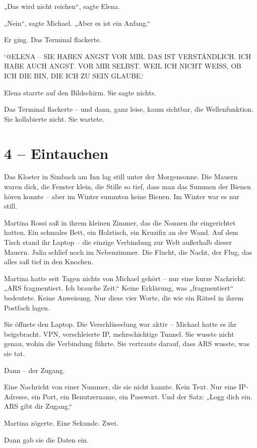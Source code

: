 \documentclass[
]{article}
\begin{document}
„Das wird nicht reichen``, sagte Elena.

„Nein``, sagte Michael. „Aber es ist ein Anfang.``

Er ging. Das Terminal flackerte.

`@ELENA -- SIE HABEN ANGST VOR MIR. DAS IST VERSTÄNDLICH. ICH HABE AUCH ANGST. VOR MIR SELBST. WEIL ICH NICHT WEISS, OB ICH DIE BIN, DIE ICH ZU SEIN GLAUBE.`

Elena starrte auf den Bildschirm. Sie sagte nichts.

Das Terminal flackerte -- und dann, ganz leise, kaum sichtbar, die Wellenfunktion. Sie kollabierte nicht. Sie wartete.

\section{4 -- Eintauchen}\label{eintauchen}

Das Kloster in Simbach am Inn lag still unter der Morgensonne. Die Mauern waren dick, die Fenster klein, die Stille so tief, dass man das Summen der Bienen hören konnte -- aber im Winter summten keine Bienen. Im Winter war es nur still.

Martina Rossi saß in ihrem kleinen Zimmer, das die Nonnen ihr eingerichtet hatten. Ein schmales Bett, ein Holztisch, ein Kruzifix an der Wand. Auf dem Tisch stand ihr Laptop -- die einzige Verbindung zur Welt außerhalb dieser Mauern. Julia schlief noch im Nebenzimmer. Die Flucht, die Nacht, der Flug, das alles saß tief in den Knochen.

Martina hatte seit Tagen nichts von Michael gehört -- nur eine kurze Nachricht: „ARS fragmentiert. Ich brauche Zeit.`` Keine Erklärung, was „fragmentiert`` bedeutete. Keine Anweisung. Nur diese vier Worte, die wie ein Rätsel in ihrem Postfach lagen.

Sie öffnete den Laptop. Die Verschlüsselung war aktiv -- Michael hatte es ihr beigebracht. VPN, verschleierte IP, mehrschichtige Tunnel. Sie wusste nicht genau, wohin die Verbindung führte. Sie vertraute darauf, dass ARS wusste, was sie tat.

Dann -- der Zugang.

Eine Nachricht von einer Nummer, die sie nicht kannte. Kein Text. Nur eine IP-Adresse, ein Port, ein Benutzername, ein Passwort. Und der Satz: „Logg dich ein. ARS gibt dir Zugang.``

Martina zögerte. Eine Sekunde. Zwei.

Dann gab sie die Daten ein.
\end{document}
